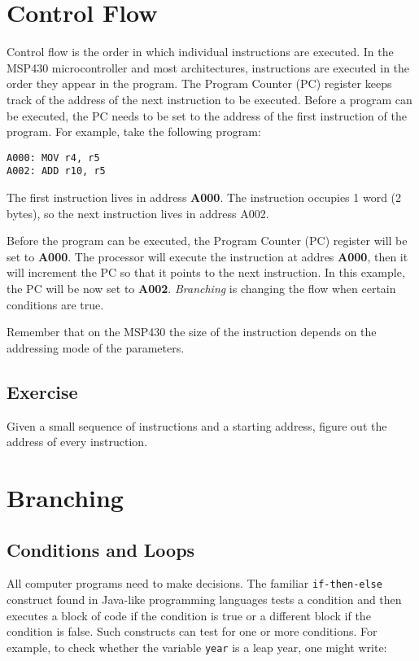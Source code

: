 \section{Control Flow}\label{control-flow}

Control flow is the order in which individual instructions are executed.
In the MSP430 microcontroller and most architectures, instructions are
executed in the order they appear in the program. The Program Counter
(PC) register keeps track of the address of the next instruction to be
executed. Before a program can be executed, the PC needs to be set to
the address of the first instruction of the program. For example, take
the following program:

\begin{verbatim}
A000: MOV r4, r5
A002: ADD r10, r5
\end{verbatim}

The first instruction lives in address \textbf{A000}. The instruction
occupies 1 word (2 bytes), so the next instruction lives in address
A002.

Before the program can be executed, the Program Counter (PC) register
will be set to \textbf{A000}. The processor will execute the instruction
at addres \textbf{A000}, then it will increment the PC so that it points
to the next instruction. In this example, the PC will be now set to
\textbf{A002}. \emph{Branching} is changing the flow when certain
conditions are true.

Remember that on the MSP430 the size of the instruction depends on the
addressing mode of the parameters.

\subsection{Exercise}\label{exercise}

Given a small sequence of instructions and a starting address, figure
out the address of every instruction.

\section{Branching}\label{branching}

\subsection{Conditions and Loops}\label{conditions-and-loops}

All computer programs need to make decisions. The familiar
\texttt{if-then-else} construct found in Java-like programming languages
tests a condition and then executes a block of code if the condition is
true or a different block if the condition is false. Such constructs can
test for one or more conditions. For example, to check whether the
variable \texttt{year} is a leap year, one might write:

